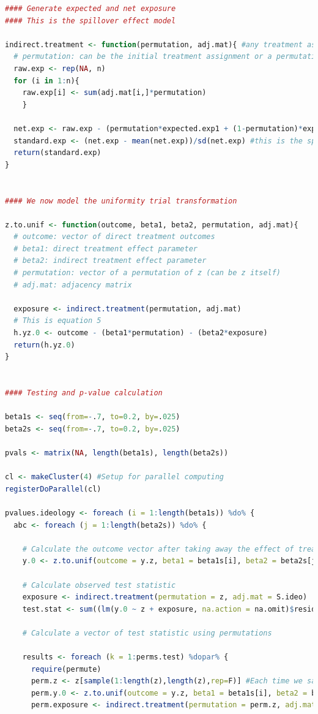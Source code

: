 \documentclass[12pt]{article}
\begin{document}
\begin{lstlisting}[language=R]
#### Generate expected and net exposure
#### This is the spillover effect model

indirect.treatment <- function(permutation, adj.mat){ #any treatment assignment vector and adjacency matrix can be used
  # permutation: can be the initial treatment assignment or a permutation
  raw.exp <- rep(NA, n)
  for (i in 1:n){
    raw.exp[i] <- sum(adj.mat[i,]*permutation)
    }
  
  net.exp <- raw.exp - (permutation*expected.exp1 + (1-permutation)*expected.exp0)
  standard.exp <- (net.exp - mean(net.exp))/sd(net.exp) #this is the spillover or indirect effect
  return(standard.exp)
}


#### We now model the uniformity trial transformation

z.to.unif <- function(outcome, beta1, beta2, permutation, adj.mat){
  # outcome: vector of direct treatment outcomes
  # beta1: direct treatment effect parameter
  # beta2: indirect treatment effect parameter
  # permutation: vector of a permutation of z (can be z itself)
  # adj.mat: adjacency matrix
  
  exposure <- indirect.treatment(permutation, adj.mat)
  # This is equation 5
  h.yz.0 <- outcome - (beta1*permutation) - (beta2*exposure)
  return(h.yz.0)
}


#### Testing and p-value calculation

beta1s <- seq(from=-.7, to=0.2, by=.025)
beta2s <- seq(from=-.7, to=0.2, by=.025)

pvals <- matrix(NA, length(beta1s), length(beta2s))

cl <- makeCluster(4) #Setup for parallel computing
registerDoParallel(cl)

pvalues.ideology <- foreach (i = 1:length(beta1s)) %do% {
  abc <- foreach (j = 1:length(beta2s)) %do% {
    
    # Calculate the outcome vector after taking away the effect of treatment
    y.0 <- z.to.unif(outcome = y.z, beta1 = beta1s[i], beta2 = beta2s[j], permutation = z, adj.mat = S.ideo)
    
    # Calculate observed test statistic
    exposure <- indirect.treatment(permutation = z, adj.mat = S.ideo)
    test.stat <- sum((lm(y.0 ~ z + exposure, na.action = na.omit)$resid)^2)
    
    # Calculate a vector of test statistic using permutations
    
    results <- foreach (k = 1:perms.test) %dopar% {
      require(permute)
      perm.z <- z[sample(1:length(z),length(z),rep=F)] #Each time we sample a permutation of z
      perm.y.0 <- z.to.unif(outcome = y.z, beta1 = beta1s[i], beta2 = beta2s[j], permutation = perm.z, adj.mat = S.ideo)
      perm.exposure <- indirect.treatment(permutation = perm.z, adj.mat = S.ideo)
      

\end{lstlisting}
\end{document}
